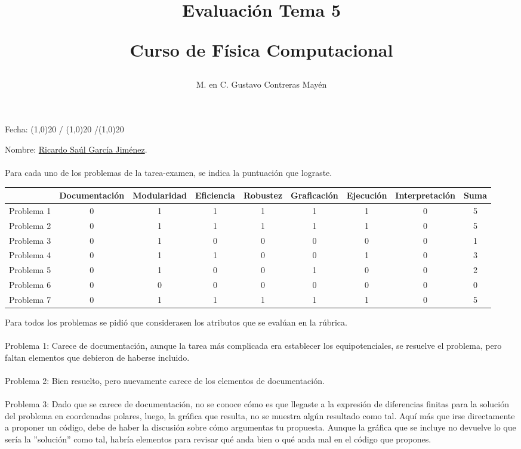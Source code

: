 \documentclass[letterpaper]{article}
\title{Evaluación Tema 5 \\ \begin{large}Curso de Física Computacional\end{large}}
\author{M. en C. Gustavo Contreras Mayén}
\date{ }
\begin{document}
\maketitle
\fontsize{10}{10}\selectfont
{}
\begin{flushright}
Fecha: \line(1,0){20} / \line(1,0){20} /\line(1,0){20}
\end{flushright}
Nombre: \underline{Ricardo Saúl García Jiménez}.
\\
\\
Para cada uno de los problemas de la tarea-examen, se indica la puntuación que lograste.
\begin{center}
\renewcommand{\arraystretch}{2.5}
\begin{tabular}{| l | c | c | c | c | c | c | c | c |}
\hline
 & Documentación & Modularidad & Eficiencia & Robustez & Graficación & Ejecución & Interpretación & Suma \\ \hline
Problema 1 & 0 & 1 & 1 & 1 & 1 & 1 & 0 & 5 \\ \hline
Problema 2 & 0 & 1 & 1 & 1 & 1 & 1 & 0 & 5 \\ \hline
Problema 3 & 0 & 1 & 0 & 0 & 0 & 0 & 0 & 1 \\ \hline
Problema 4 & 0 & 1 & 1 & 0 & 0 & 1 & 0 & 3 \\ \hline
Problema 5 & 0 & 1 & 0 & 0 & 1 & 0 & 0 & 2 \\ \hline
Problema 6 & 0 & 0 & 0 & 0 & 0 & 0 & 0 & 0 \\ \hline
Problema 7 & 0 & 1 & 1 & 1 & 1 & 1 & 0 & 5 \\ \hline
\end{tabular}
\end{center}
\fontsize{14}{14}\selectfont
Para todos los problemas se pidió que considerasen los atributos que se evalúan en la rúbrica.
\\
\\
Problema 1: Carece de documentación, aunque la tarea más complicada era establecer los equipotenciales, se resuelve el problema, pero faltan elementos que debieron de haberse incluido.
\\
\\
Problema 2: Bien resuelto, pero  nuevamente carece de los elementos de documentación.
\\
\\
Problema 3: Dado que se carece de documentación, no se conoce cómo es que llegaste a la expresión de diferencias finitas para la solución del problema en coordenadas polares, luego, la gráfica que resulta, no se muestra algún resultado como tal. Aquí más que irse directamente a proponer un código, debe de haber la discusión sobre cómo argumentas tu propuesta. Aunque la gráfica que se incluye no devuelve lo que sería la ''solución'' como tal, habría elementos para revisar qué anda bien o qué anda mal en el código que propones.
\end{document}
